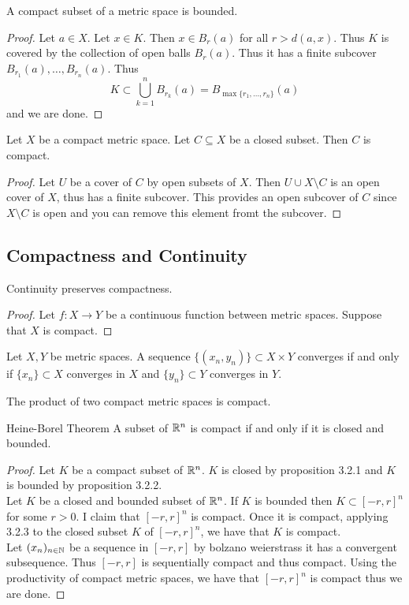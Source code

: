 \documentclass[a4paper]{article}
\begin{document}
\begin{prp}{}{} A compact subset of a metric space is bounded. 
\begin{proof}
Let $a\in X$. Let $x\in K$. Then $x\in B_r(a)$ for all $r>d(a,x)$. Thus $K$ is covered by the collection of open balls $B_r(a)$. Thus it has a finite subcover $B_{r_1}(a),\dots,B_{r_n}(a)$. Thus $$K\subset\bigcup_{k=1}^nB_{r_k}(a)=B_{\max\{r_1,\dots,r_n\}}(a)$$ and we are done. 
\end{proof}
\end{prp}

\begin{prp}{}{} Let $X$ be a compact metric space. Let $C\subseteq X$ be a closed subset. Then $C$ is compact. 
\begin{proof}
Let $U$ be a cover of $C$ by open subsets of $X$. Then $U\cup X\setminus C$ is an open cover of $X$, thus has a finite subcover. This provides an open subcover of $C$ since $X\setminus C$ is open and you can remove this element fromt the subcover. 
\end{proof}
\end{prp}

\subsection{Compactness and Continuity}
\begin{thm}{}{} Continuity preserves compactness. 
\begin{proof}
Let $f:X\to Y$ be a continuous function between metric spaces. Suppose that $X$ is compact. 
\end{proof}
\end{thm}

\begin{lmm}{}{} Let $X,Y$ be metric spaces. A sequence $\{(x_n,y_n)\}\subset X\times Y$ converges if and only if $\{x_n\}\subset X$ converges in $X$ and $\{y_n\}\subset Y$ converges in $Y$. 
\end{lmm}

\begin{prp}{}{} The product of two compact metric spaces is compact. 
\end{prp}

\begin{thm}{Heine-Borel Theorem}{} A subset of $\mathbb{R}^n$ is compact if and only if it is closed and bounded. 
\begin{proof}
Let $K$ be a compact subset of $\mathbb{R}^n$. $K$ is closed by proposition 3.2.1 and $K$ is bounded by proposition 3.2.2. \\
Let $K$ be a closed and bounded subset of $\mathbb{R}^n$. If $K$ is bounded then $K\subset[-r,r]^n$ for some $r>0$. I claim that $[-r,r]^n$ is compact. Once it is compact, applying 3.2.3 to the closed subset $K$ of $[-r,r]^n$, we have that $K$ is compact. \\
Let $(x_n)_{n\in\mathbb{N}}$ be a sequence in $[-r,r]$ by bolzano weierstrass it has a convergent subsequence. Thus $[-r,r]$ is sequentially compact and thus compact. Using the productivity of compact metric spaces, we have that $[-r,r]^n$ is compact thus we are done. 
\end{proof}
\end{thm}
\end{document}
